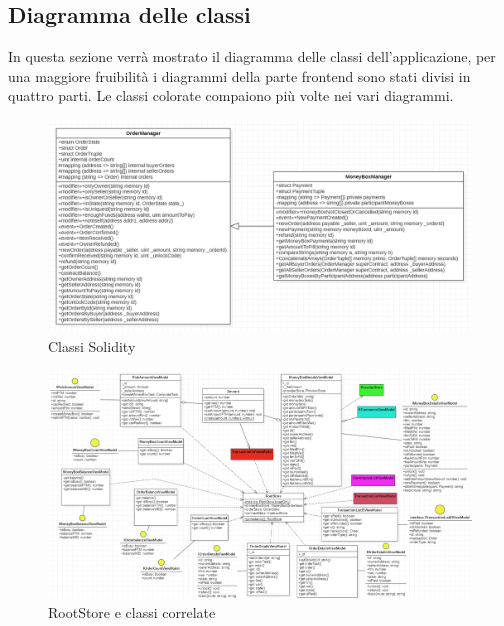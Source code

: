 \subsection{Diagramma delle classi}

In questa sezione verrà mostrato il diagramma delle classi dell'applicazione, 
per una maggiore fruibilità i diagrammi della parte frontend sono stati divisi in quattro parti.
Le classi colorate compaiono più volte nei vari diagrammi.

\begin{figure}[H]
    \begin{center}
    \includegraphics[scale=0.5]{immagini/smartcontracts.png}
    \caption{Classi Solidity}
    \end{center}
\end{figure}

\begin{landscape}
\begin{figure}[H]
    \begin{center}
    \includegraphics[scale=0.7]{immagini/rootstore.png}
    \caption{RootStore e classi correlate}
    \end{center}
\end{figure}
\end{landscape}

